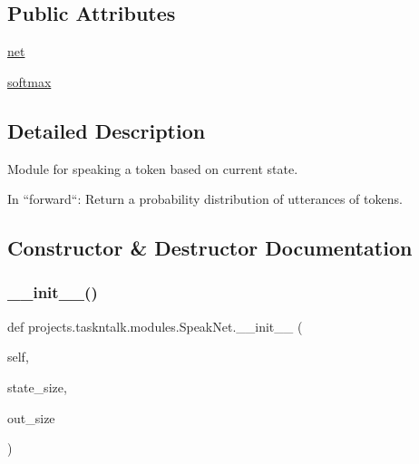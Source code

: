 \subsection*{Public Attributes}
\begin{DoxyCompactItemize}
\item 
\hyperlink{classprojects_1_1taskntalk_1_1modules_1_1SpeakNet_ad9777e1aceeb36bedb44e5bcbf9cf7c3}{net}
\item 
\hyperlink{classprojects_1_1taskntalk_1_1modules_1_1SpeakNet_aa6d9a715cdd73868cd0d57f4e5e240e0}{softmax}
\end{DoxyCompactItemize}


\subsection{Detailed Description}
\begin{DoxyVerb}Module for speaking a token based on current state.

In ``forward``: Return a probability distribution of utterances of tokens.
\end{DoxyVerb}
 

\subsection{Constructor \& Destructor Documentation}
\mbox{\label{classprojects_1_1taskntalk_1_1modules_1_1SpeakNet_a2ecf76584e43c792e8480146b99dc746}} 
\subsubsection{\texorpdfstring{\+\_\+\+\_\+init\+\_\+\+\_\+()}{\_\_init\_\_()}}
{\footnotesize\ttfamily def projects.\+taskntalk.\+modules.\+Speak\+Net.\+\_\+\+\_\+init\+\_\+\+\_\+ (\begin{DoxyParamCaption}\item[{}]{self,  }\item[{}]{state\+\_\+size,  }\item[{}]{out\+\_\+size }\end{DoxyParamCaption})}



